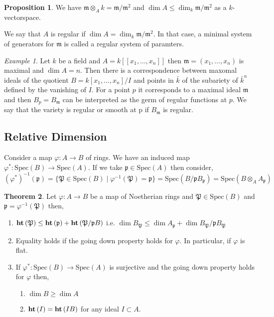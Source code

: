 \documentclass[12pt]{article}
\newcommand{\Spec}[1]{\mathrm{Spec}\left( #1 \right)}
\newcommand{\p}{\mathfrak{p}}
\renewcommand{\P}{\mathfrak{P}}
\newcommand{\m}{\mathfrak{m}}
\theoremstyle{remark}
\newtheorem*{example}{Example}
\theoremstyle{definition}
\newtheorem{theorem}{Theorem}[section]
\newtheorem{proposition}[theorem]{Proposition}
\newenvironment{definition}[1][Definition:]{\begin{trivlist}
\item[\hskip \labelsep {\bfseries #1}]}{\end{trivlist}}
\begin{document}
\begin{proposition}
We have $\m \otimes_A k = \m / \m^2$ and $\dim{A} \le \dim_k{\m / \m^2}$ as a $k$-vectorspace. 
\end{proposition}

\begin{definition}
We say that $A$ is regular if $\dim{A} = \dim_k{\m / \m^2}$. In that case, a minimal system of generators for $\m$ is called a regular system of paramters.
\end{definition}

\begin{example}
Let $k$ be a field and $A = k[[x_1, \dots, x_n]]$ then $\m = (x_1, \dots, x_n)$ is maximal and $\dim{A} = n$. Then there is a correspondence between maxomal ideals of the quotient $B = k[x_1, \dots, x_n] / I$ and points in $\bar{k}$ of the subariety of $\bar{k}^n$ defined by the vanishing of $I$. For a point $p$ it corresponds to a maximal ideal $\m$ and then $B_p = B_{\m}$ can be interpreted as the germ of regular functions at $p$. We say that the variety is regular or smooth at p if $B_{\m}$ is regular. 
\end{example}

\subsection{Relative Dimension}

Consider a map $\varphi : A \to B$ of rings. We have an induced map $\varphi^* : \Spec{B} \to \Spec{A}$. If we take $\p \in \Spec{A}$ then consider,
\[ (\varphi^*)^{-1}(\p) = \{ \P \in \Spec{B} \mid \varphi^{-1}(\P) = \p \} = \Spec{B / \p B_\p} = \Spec{B \otimes_A A_{\p}} \]

\begin{theorem}
Let $\varphi : A \to B$ be a map of Noetherian rings and $\P \in \Spec{B}$ and $\p = \varphi^{-1}(\P)$ then,
\begin{enumerate}
\item $\height{\P} \le \height{\p} + \height{\P / \p B}$ i.e. $\dim{B_{\P}} \le \dim{A_{\p}} + \dim{B_{\P}/ \p B_{\P}}$
\item Equality holds if the going down property holds for $\varphi$. In particular, if $\varphi$ is flat.

\item If $\varphi^* : \Spec{B} \to \Spec{A}$ is surjective and the going down property holds for $\varphi$ then,
\begin{enumerate}
\item $\dim{B} \ge \dim{A}$
\item $\mathbf{ht}\left( I \right) = \mathbf{ht}\left( IB \right)$ for any ideal $I \subset A$. 
\end{enumerate}
\end{enumerate}
\end{theorem} 
\end{document}
